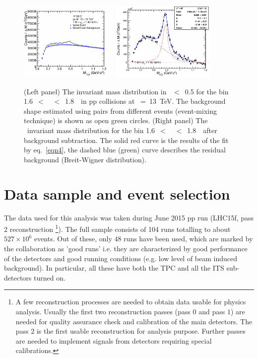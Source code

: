 \begin{figure}[ht]
\centering
\includegraphics[width= 0.425\textwidth]{Images/Chapter5/inv_mass/invmass6.png}
\includegraphics[width= 0.45\textwidth]{Images/Chapter5/Signal/signal6.png}
\caption{(Left panel) The \kshort\ppm invariant mass distribution in \modrap~$<$~0.5 for the bin 
1.6~$<$~\pT~$<$~1.8~\gmom~in pp collisions at \sqrtS~=~13~TeV. The background shape estimated using pairs from different events (event-mixing technique) is shown as open green circles. (Right panel) The \kshort\ppm~invariant mass distribution for the bin 1.6~$<$~\pT~$<$~1.8~\gmom~after background subtraction. The solid red curve is the results of the fit by eq.~\ref{eqn4}, the dashed blue (green) curve describes the residual background (Breit-Wigner distribution).}
\label{Fig:chap5-5.1} 
\end{figure}

\section{Data sample and event selection}
\label{par:5.2}

The data used for this analysis was taken during June 2015 pp run (LHC15f, pass 2 reconstruction \footnote{A few reconstruction processes are needed to obtain data usable for physics analysis. Usually the first two reconstruction passes (pass $0$ and pass $1$) are needed for quality assurance check and calibration of the main detectors. The pass $2$ is the first usable reconstruction for analysis purpose. Further passes are needed to implement signals from detectors requiring special calibrations.}). The full sample consists of 104 runs totalling to about $527 \times 10^{6}$ events. Out of these, only 48 runs have been used, which are marked by the collaboration as 'good runs' i.e. they are characterized by good performance of the detectors and good running conditions (e.g. low level of beam induced background). In particular, all these  have both the TPC and all the ITS sub-detectors turned on.


